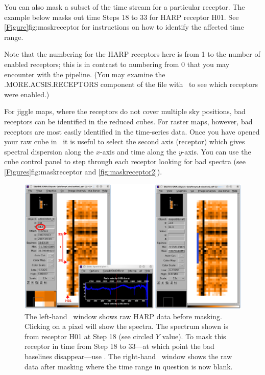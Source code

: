 \documentclass[11pt,oneside,chapters]{starlink}
\begin{document}
\begin{terminalv}
\end{terminalv}
You can also mask a subset of the time stream for a particular
receptor. The example below masks out time Steps 18 to 33 for HARP receptor
H01. See \cref{Figure}{fig:maskreceptor}{} for instructions on how to
identify the affected time range.
\begin{terminalv}
\end{terminalv}
Note that the numbering for the HARP receptors here is from
1 to the number of enabled receptors; this is in
contrast to numbering from 0 that you may encounter with the pipeline.
(You may examine the .MORE.ACSIS.RECEPTORS component of the
file with \HDSTRACE\ to see which receptors were enabled.)

For jiggle maps, where the receptors do not cover multiple sky
positions, bad receptors can be identified in the reduced cubes. For
raster maps, however, bad receptors are most easily identified in the
time-series data. Once you have opened your raw cube in \gaia\ it is
useful to select the second axis (receptor) which gives spectral
dispersion along the $x$-axis and time along the $y$-axis. You can use
the cube control panel to step through each receptor looking for bad
spectra (see \cref{Figures}{fig:maskreceptor}{} and
\ref{fig:maskreceptor2}).

\begin{figure}[h!]
\begin{center}
\includegraphics[width=1\linewidth]{sc20_maskreceptor}
\caption[Identifying bad receptors in the raw data.]{\label{fig:maskreceptor}
  The left-hand \gaia\ window shows raw HARP data before masking.
  Clicking on a pixel will show the spectra. The spectrum shown is from
  receptor H01 at Step 18 (see circled $Y$ value). To mask this receptor
  in time from Step 18 to 33---at which point the bad baselines
  disappear---use \chpix. The right-hand \gaia\ window shows the raw
  data after masking where the time range in question is now blank.}
\end{center}
\end{figure}
\end{document}
